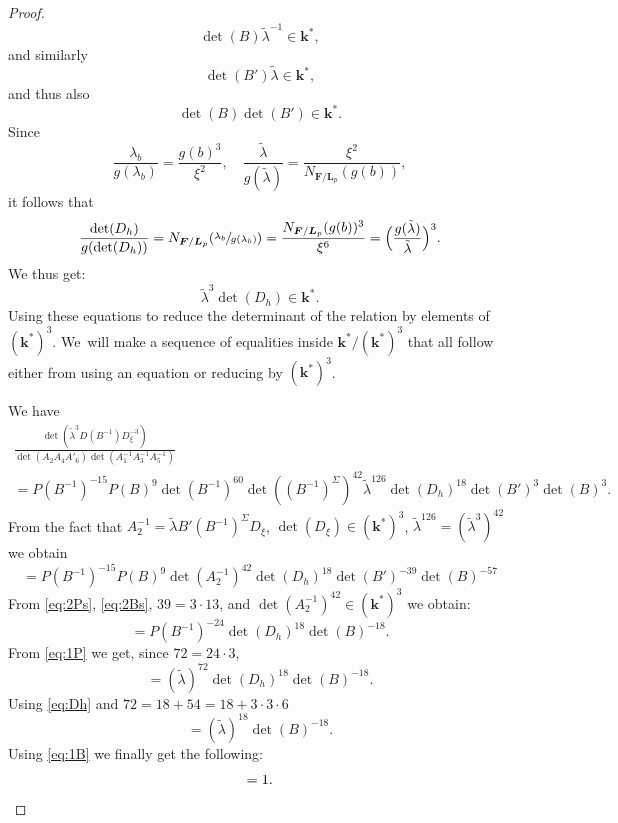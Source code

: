 \documentclass[JEP,XML,SOM,Unicode,NoFloatCountersInSection, NoEqCountersInSection,published]{cedram}
\theoremstyle{definition}
\newcommand{\kk}{{\boldsymbol{k}}}
\newcommand{\FF}{{\boldsymbol{F}}}
\newcommand{\LL}{{\boldsymbol{L}}}
\begin{document}
\begin{proof}
\begin{equation} \label{eq:1B}
\det(B) \tilde \lambda^{-1} \in \kk^*,
\end{equation}
and similarly\vspace*{-3pt}
\[
\det(B') \tilde \lambda \in \kk^*,
\]
and thus also\vspace*{-3pt}
\begin{equation} \label{eq:2Bs}
\det(B)\det(B') \in \kk^*.
\end{equation}
Since\vspace*{-3pt}
\[
\frac{\lambda_b}{g(\lambda_b)} = \frac{g(b)^3}{\xi^2}, \quad\frac{\tilde \lambda}{g(\tilde \lambda)} = \frac{\xi^2}{N_{\FF/\LL_p}(g(b))},
\]
it follows that\vspace*{-3pt}
\[
\frac{\det(D_h)}{g(\det(D_h))} = N_{\FF/\LL_p}(\sfrac{\lambda_b}{g(\lambda_b)}) = \frac{N_{\FF/\LL_p}(g(b))^3}{\xi^6} =\Bigl(\frac{g(\tilde \lambda)}{\tilde \lambda}\Bigr)^3.
\]
We thus get:\vspace*{-3pt}
\begin{equation} \label{eq:Dh}
\tilde \lambda^3 \det(D_h) \in \kk^*.
\end{equation}
Using these equations to reduce the determinant of the relation by elements of $(\kk^*)^3$. We~will make a sequence of equalities inside $\kk^*/(\kk^*)^3$ that all follow either from using an equation or reducing by $(\kk^*)^3$.

We have\vspace*{-3pt}
\begin{multline*}
\frac{\det(\tilde \lambda^3 D(B^{-1})D_{\xi}^{-3})}{\det(A_2A_4A'_6)\det(A_1^{-1}A_3^{-1}A_5^{-1})}
\\
= P(B^{-1})^{-15} P(B)^9 \det(B^{-1})^{60} \det((B^{-1})^{\Sigma})^{42} \tilde \lambda^{126} \det(D_h)^{18}\det(B')^3\det(B)^3.
\end{multline*}
From the fact that $A_2^{-1} = \tilde \lambda B' (B^{-1})^{\Sigma} D_{\xi}$, $\det(D_{\xi}) \in (\kk^*)^3$, $\tilde \lambda^{126} = (\tilde \lambda ^3)^{ 42}$ we obtain
\[= P(B^{-1})^{-15} P(B)^9 \det(A_2^{-1})^{42} \det(D_h)^{18}\det(B')^{-39}\det(B)^{-57}
\]
From \eqref{eq:2Ps}, \eqref{eq:2Bs}, $39=3 \cdot 13$, and $ \det(A_2^{-1})^{42} \in (\kk^*)^3$ we obtain:\vspace*{-3pt}
\[
= P(B^{-1})^{-24} \det(D_h)^{18}\det(B)^{-18}.
\]
From \eqref{eq:1P} we get, since $72 = 24 \cdot 3$,\vspace*{-3pt}
\[
= (\tilde \lambda)^{72} \det(D_h)^{18}\det(B)^{-18}.
\]
Using \eqref{eq:Dh} and $72 = 18 + 54 = 18 + 3 \cdot 3 \cdot 6$
\[
= (\tilde \lambda)^{18} \det(B)^{-18}.
\]
Using \eqref{eq:1B} we finally get the following:
\[
= 1.\qedhere
\]
\end{proof}
\end{document}
